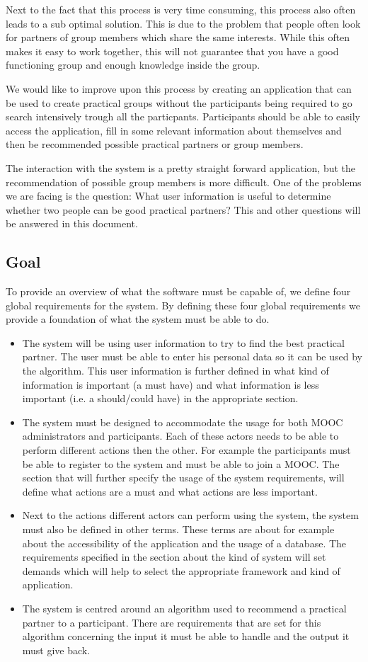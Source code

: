 \documentclass[]{article}
\begin{document}
Next to the fact that this process is very time consuming, this process also often leads to a sub optimal solution.
This is due to the problem that people often look for partners of group members which share the same interests.
While this often makes it easy to work together, this will not guarantee that you have a good functioning group and enough knowledge inside the group.

We would like to improve upon this process by creating an application that can be used to create practical groups without the participants being required to go search intensively trough all the particpants.
Participants should be able to easily access the application, fill in some relevant information about themselves and then be recommended possible practical partners or group members.

The interaction with the system is a pretty straight forward application, but the recommendation of possible group members is more difficult.
One of the problems we are facing is the question: What user information is useful to determine whether two people can be good practical partners?
This and other questions will be answered in this document.

\subsection{Goal}
To provide an overview of what the software must be capable of, we define four global requirements for the system.
By defining these four global requirements we provide a foundation of what the system must be able to do.
\begin{itemize}
\item The system will be using user information to try to find the best practical partner.
The user must be able to enter his personal data so it can be used by the algorithm.
This user information is further defined in what kind of information is important (a must have) and what information is less important (i.e. a should/could have) in the appropriate section.
\item The system must be designed to accommodate the usage for both MOOC administrators and participants.
Each of these actors needs to be able to perform different actions then the other.
For example the participants must be able to register to the system and must be able to join a MOOC.
The section that will further specify the usage of the system requirements, will define what actions are a must and what actions are less important.
\item Next to the actions different actors can perform using the system, the system must also be defined in other terms.
These terms are about for example about the accessibility of the application and the usage of a database.
The requirements specified in the section about the kind of system will set demands which will help to select the appropriate framework and kind of application.
\item The system is centred around an algorithm used to recommend a practical partner to a participant.
There are requirements that are set for this algorithm concerning the input it must be able to handle and the output it must give back.
\end{itemize}
\end{document}
